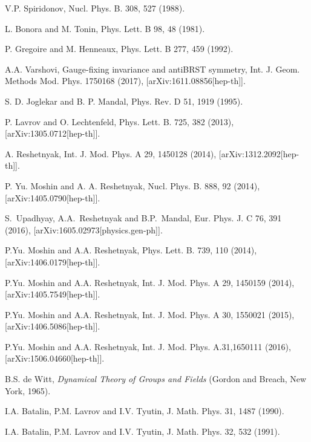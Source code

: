 \documentclass[10pt]{article}
\begin{document}
\begin{thebibliography}{99}
 V.P. Spiridonov, Nucl. Phys. B. 308, 527 (1988).

 L. Bonora and M. Tonin,
 Phys. Lett. B 98,  48
(1981).

P. Gregoire and M. Henneaux, %
Phys. Lett. B
277,  459  (1992).

A.A. Varshovi, Gauge-fixing invariance and antiBRST symmetry, Int. J. Geom. Methods Mod. Phys. 1750168 (2017),  [arXiv:1611.08856[hep-th]].

 S. D. Joglekar and B. P. Mandal, {Phys. Rev.} {D 51}, 1919
(1995).

 P. Lavrov and O. Lechtenfeld, Phys. Lett. B. 725, 382 (2013), [arXiv:1305.0712[hep-th]].

 A. Reshetnyak, Int. J. Mod. Phys. A 29, 1450128 (2014), [arXiv:1312.2092[hep-th]].

 P. Yu. Moshin and A. A. Reshetnyak, Nucl. Phys. B. 888, 92
(2014), [arXiv:1405.0790[hep-th]].

S.~Upadhyay, A.A.~Reshetnyak and B.P.~Mandal, Eur. Phys. J. C 76, 391  (2016), [arXiv:1605.02973[physics.gen-ph]].


 P.Yu. Moshin and  A.A. Reshetnyak, Phys. Lett. B. 739,
110 (2014), [arXiv:1406.0179[hep-th]].

 P.Yu. Moshin  and  A.A. Reshetnyak,  Int. J. Mod. Phys.
A 29,  1450159 (2014),  [arXiv:1405.7549[hep-th]].

 P.Yu. Moshin and  A.A. Reshetnyak, Int. J. Mod. Phys. A 30, 1550021 (2015), [arXiv:1406.5086[hep-th]].

 P.Yu. Moshin  and  A.A. Reshetnyak,  Int. J. Mod. Phys. A.31,1650111  (2016), [arXiv:1506.04660[hep-th]].

B.S. de Witt, \emph{Dynamical Theory of Groups and Fields}
(Gordon and Breach, New York, 1965).

I.A. Batalin, P.M. Lavrov and I.V. Tyutin, %
J. Math. Phys. 31,  1487 (1990).

I.A. Batalin, P.M. Lavrov and I.V. Tyutin,
J. Math. Phys. 32,  532  (1991).


\end{thebibliography}
\end{document}
